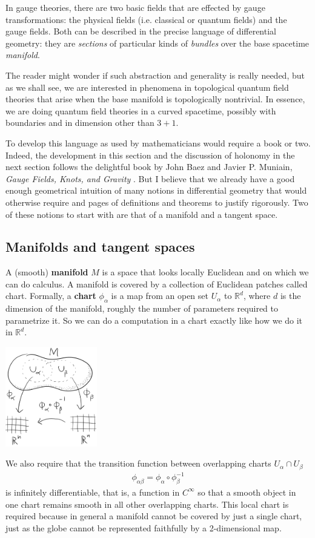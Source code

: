 \documentclass[aps,nofootinbib]{revtex4}
\begin{document}
In gauge theories, there are two basic fields that are effected by gauge transformations: the physical fields (i.e. classical or quantum fields) and the gauge fields. Both can be described in the precise language of differential geometry: they are \emph{sections} of particular kinds of \emph{bundles} over the base spacetime \emph{manifold}. 

The reader might wonder if such abstraction and generality is really needed, but as we shall see, we are interested in phenomena in topological quantum field theories that arise when the base manifold is topologically nontrivial. In essence, we are doing quantum field theories in a curved spacetime, possibly with boundaries and in dimension other than $3+1$. 

To develop this language as used by mathematicians would require a book or two. Indeed, the development in this section and the discussion of holonomy in the next section follows the delightful book by John Baez and Javier P. Muniain, \emph{Gauge Fields, Knots, and Gravity} \cite{Baez94}. But I believe that we already have a good enough geometrical intuition of many notions in differential geometry that would otherwise require and pages of definitions and theorems to justify rigorously. Two of these notions to start with are that of a manifold and a tangent space. 

\subsection{Manifolds and tangent spaces}

A (smooth) {\bf manifold} $M$ is a space that looks locally Euclidean and  on which we can do calculus. A manifold is covered by a collection of Euclidean patches called chart. Formally, a {\bf chart} $\phi_{\alpha}$ is a map from an open set $U_{\alpha}$ to $\mathbb{R}^d$, where $d$ is the dimension of the manifold, roughly the number of parameters required to parametrize it. So we can do a computation in a chart exactly like how we do it in $\mathbb{R}^d$.
\begin{center}
\includegraphics[width=0.3\textwidth]{manifold.png}
\end{center}
We also require that the transition function between overlapping charts $U_{\alpha} \cap U_{\beta}$
\begin{align*}
\phi_{\alpha \beta} = \phi_{\alpha} \circ \phi_{\beta}^{-1}
\end{align*}
is infinitely differentiable, that is, a function in $C^{\infty}$ so that a smooth object in one chart remains smooth in all other overlapping charts. This local chart is required because in general a manifold cannot be covered by just a single chart, just as the globe cannot be represented faithfully by a 2-dimensional map.
\end{document}
